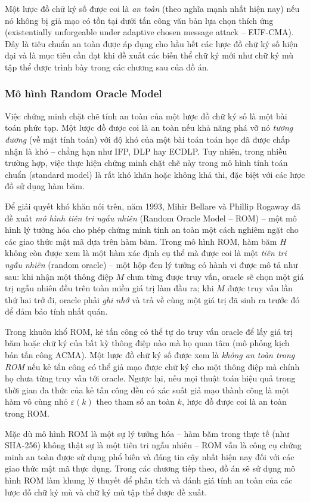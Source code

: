 Một lược đồ chữ ký số được coi là \textit{an toàn} (theo nghĩa mạnh nhất hiện nay) nếu nó không bị giả mạo có tồn tại dưới tấn công văn bản lựa chọn thích ứng (existentially unforgeable under adaptive chosen message attack -- EUF-CMA). Đây là tiêu chuẩn an toàn được áp dụng cho hầu hết các lược đồ chữ ký số hiện đại và là mục tiêu cần đạt khi đề xuất các biến thể chữ ký mới như chữ ký mù tập thể được trình bày trong các chương sau của đồ án.

\subsubsection{Mô hình Random Oracle Model}

Việc chứng minh chặt chẽ tính an toàn của một lược đồ chữ ký số là một bài toán phức tạp. Một lược đồ được coi là an toàn nếu khả năng phá vỡ nó \textit{tương đương} (về mặt tính toán) với độ khó của một bài toán toán học đã được chấp nhận là khó -- chẳng hạn như IFP, DLP hay ECDLP. Tuy nhiên, trong nhiều trường hợp, việc thực hiện chứng minh chặt chẽ này trong mô hình tính toán chuẩn (standard model) là rất khó khăn hoặc không khả thi, đặc biệt với các lược đồ sử dụng hàm băm.

Để giải quyết khó khăn nói trên, năm 1993, Mihir Bellare và Phillip Rogaway đã đề xuất \textit{mô hình tiên tri ngẫu nhiên} (Random Oracle Model -- ROM) -- một mô hình lý tưởng hóa cho phép chứng minh tính an toàn một cách nghiêm ngặt cho các giao thức mật mã dựa trên hàm băm. Trong mô hình ROM, hàm băm $H$ không còn được xem là một hàm xác định cụ thể mà được coi là một \textit{tiên tri ngẫu nhiên} (random oracle) -- một hộp đen lý tưởng có hành vi được mô tả như sau: khi nhận một thông điệp $M$ chưa từng được truy vấn, oracle sẽ chọn một giá trị ngẫu nhiên đều trên toàn miền giá trị làm đầu ra; khi $M$ được truy vấn lần thứ hai trở đi, oracle phải \textit{ghi nhớ} và trả về cùng một giá trị đã sinh ra trước đó để đảm bảo tính nhất quán.

Trong khuôn khổ ROM, kẻ tấn công có thể tự do truy vấn oracle để lấy giá trị băm hoặc chữ ký của bất kỳ thông điệp nào mà họ quan tâm (mô phỏng kịch bản tấn công ACMA). Một lược đồ chữ ký số được xem là \textit{không an toàn trong ROM} nếu kẻ tấn công có thể giả mạo được chữ ký cho một thông điệp mà chính họ chưa từng truy vấn tới oracle. Ngược lại, nếu mọi thuật toán hiệu quả trong thời gian đa thức của kẻ tấn công đều có xác suất giả mạo thành công là một hàm vô cùng nhỏ $\varepsilon(k)$ theo tham số an toàn $k$, lược đồ được coi là an toàn trong ROM.

Mặc dù mô hình ROM là một sự lý tưởng hóa -- hàm băm trong thực tế (như SHA-256) không thật sự là một tiên tri ngẫu nhiên -- ROM vẫn là công cụ chứng minh an toàn được sử dụng phổ biến và đáng tin cậy nhất hiện nay đối với các giao thức mật mã thực dụng. Trong các chương tiếp theo, đồ án sẽ sử dụng mô hình ROM làm khung lý thuyết để phân tích và đánh giá tính an toàn của các lược đồ chữ ký mù và chữ ký mù tập thể được đề xuất.
